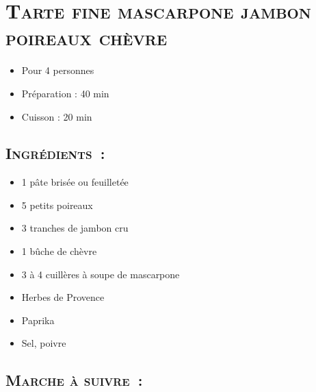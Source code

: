 \section[\normalsize{Tarte fine mascarpone jambon poireaux ch\`evre}]{\LARGE{\textsc{Tarte fine mascarpone jambon poireaux ch\`evre}}}		%


\begin{itemize}
\item Pour 4 personnes
\item Préparation : 40 min
\item Cuisson : 20 min
\end{itemize}

\subsection*{\textsc{Ingr\'edients~:}}

\begin{itemize}
\item 1 p\^ate bris\'ee ou feuillet\'ee
\item 5 petits poireaux
\item 3 tranches de jambon cru
\item 1 bûche de ch\`evre
\item 3 \`a 4 cuill\`eres \`a soupe de mascarpone
\item Herbes de Provence
\item Paprika
\item Sel, poivre
\end{itemize}


\subsection*{\textsc{Marche \`a suivre~:}}

